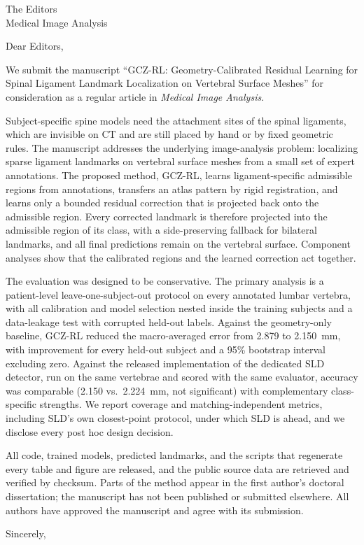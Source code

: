 \documentclass[11pt]{letter}
\begin{document}
\begin{letter}{The Editors\\Medical Image Analysis}
\opening{Dear Editors,}

We submit the manuscript ``GCZ-RL: Geometry-Calibrated Residual Learning for Spinal Ligament Landmark Localization on Vertebral Surface Meshes'' for consideration as a regular article in \emph{Medical Image Analysis}.

Subject-specific spine models need the attachment sites of the spinal ligaments, which are invisible on CT and are still placed by hand or by fixed geometric rules. The manuscript addresses the underlying image-analysis problem: localizing sparse ligament landmarks on vertebral surface meshes from a small set of expert annotations. The proposed method, GCZ-RL, learns ligament-specific admissible regions from annotations, transfers an atlas pattern by rigid registration, and learns only a bounded residual correction that is projected back onto the admissible region. Every corrected landmark is therefore projected into the admissible region of its class, with a side-preserving fallback for bilateral landmarks, and all final predictions remain on the vertebral surface. Component analyses show that the calibrated regions and the learned correction act together.

The evaluation was designed to be conservative. The primary analysis is a patient-level leave-one-subject-out protocol on every annotated lumbar vertebra, with all calibration and model selection nested inside the training subjects and a data-leakage test with corrupted held-out labels. Against the geometry-only baseline, GCZ-RL reduced the macro-averaged error from 2.879 to 2.150~mm, with improvement for every held-out subject and a 95\% bootstrap interval excluding zero. Against the released implementation of the dedicated SLD detector, run on the same vertebrae and scored with the same evaluator, accuracy was comparable (2.150 vs.\ 2.224~mm, not significant) with complementary class-specific strengths. We report coverage and matching-independent metrics, including SLD's own closest-point protocol, under which SLD is ahead, and we disclose every post hoc design decision.

All code, trained models, predicted landmarks, and the scripts that regenerate every table and figure are released, and the public source data are retrieved and verified by checksum. Parts of the method appear in the first author's doctoral dissertation; the manuscript has not been published or submitted elsewhere. All authors have approved the manuscript and agree with its submission. %

\closing{Sincerely,}
\end{letter}
\end{document}
